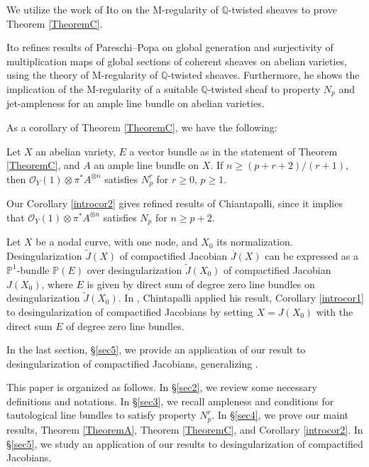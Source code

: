 \documentclass[11pt,letter]{amsart}
\numberwithin{equation}{section}
\begin{document}
We utilize the work of Ito \cite{Ito22} on the M-regularity of $\mathbb{Q}$-twisted sheaves to prove Theorem \ref{TheoremC}.

   Ito \cite{Ito22} refines results of Pareschi--Popa \cite{PP03,PP11} on global generation and surjectivity of multiplication maps of global sections of coherent sheaves on abelian varieties, using the theory of M-regularity of $\mathbb{Q}$-twisted sheaves. Furthermore, he shows the implication of the M-regularity of a suitable $\mathbb{Q}$-twisted sheaf to property $N_p$ and jet-ampleness for an ample line bundle on abelian varieties. 
   
   
As a corollary of Theorem \ref{TheoremC}, we have the following:
\begin{introcor}\label{introcor2}
  Let $X$ an abelian variety, $E$ a vector bundle as in the statement of Theorem \ref{TheoremC}, and $A$ an ample line bundle on $X$. If $n\geq (p+r+2)/(r+1)$, then $\mathcal{O}_Y(1)\otimes\pi^* A^{\otimes n}$ satisfies $N_p^r$ for $r\geq 0$, $p\geq 1$.
  \end{introcor}

  Our Corollary \ref{introcor2} gives refined results of Chiantapalli, since it implies that $\mathcal{O}_Y(1)\otimes\pi^*A^{\otimes n}$ satisfies $N_p$ for $n\geq p+2$. 
  


  
  
 Let $X$ be a nodal curve, with one node, and $X_0$ its normalization. Desingularization $\widetilde{J}(X)$ of compactified Jacobian $\overline{J}(X)$ can be expressed as a $\mathbb{P}^1$-bundle $\mathbb{P}(E)$ over desingularization $\widetilde{J}(X_0)$ of compactified Jacobian $J(X_0)$, where $E$ is given by direct sum of degree zero line bundles on desingularization $\widetilde{J}(X_0)$. In \cite[Theorem 5.4]{Chi19}, Chintapalli applied his result, Corollary \ref{introcor1} to desingularization of compactified Jacobians by setting $X=J(X_0)$ with the direct sum $E$ of degree zero line bundles.
 
  In the last section, \S\ref{sec5}, we provide an application of our result to desingularization of compactified Jacobians, generalizing \cite[Theorem 5.4]{Chi19}. 
  
  
  
  
  
  This paper is organized as follows. In \S\ref{sec2}, we review some necessary definitions and notations. In \S\ref{sec3}, we recall ampleness and conditions for tautological line bundles to satisfy property $N_p^r$. In \S\ref{sec4}, we prove our maint results, Theorem \ref{TheoremA}, Theorem \ref{TheoremC}, and Corollary \ref{introcor2}. In \S\ref{sec5}, we study an application of our results to desingularization of compactified Jacobians.
  
\end{document}

